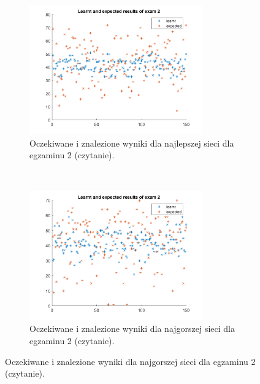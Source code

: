 \documentclass[12pt]{article}
\begin{document}
\begin{figure}[H]
\begin{subfigure}[t]{0.48\textwidth} 
\centering
\includegraphics[height=2.2in]{best_results_2.png}
\caption{Oczekiwane i znalezione wyniki dla najlepszej sieci dla egzaminu 2 (czytanie).}
\end{subfigure}
~~
\begin{subfigure}[t]{0.48\textwidth} 
\centering
\includegraphics[height=2.2in]{worst_exam_2.png}
\caption{Oczekiwane i znalezione wyniki dla najgorszej sieci dla egzaminu 2 (czytanie).}
\end{subfigure}


\end{figure}
\end{document}
